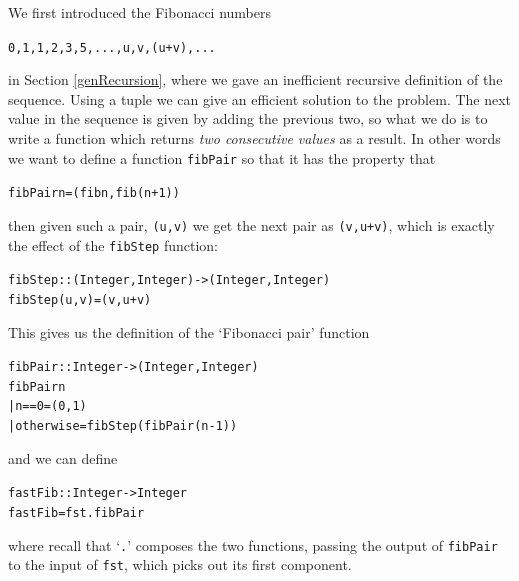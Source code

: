 \begin{example}
We first introduced the Fibonacci numbers 
\begin{alltt}
0, 1, 1, 2, 3, 5, ... , u, v, (u+v), ...
\end{alltt}
in Section \ref{genRecursion}, where we gave an inefficient recursive definition of
the sequence. Using a tuple we can give an efficient
solution to the problem. The next value in the sequence is given by
adding the previous two, so what we do is to write a function which
returns {\em two consecutive values\/} as a result. In other words we want to define
a function \texttt{fibPair} so that it has the property that
\begin{alltt}
fibPair n = (fib n , fib (n+1))
\end{alltt} 
then given such a pair, \texttt{(u,v)} we get the next pair as
\texttt{(v,u+v)}, which is exactly the effect of the \texttt{fibStep} function:
\begin{alltt}
fibStep :: (Integer,Integer) -> (Integer,Integer)
fibStep (u,v) = (v,u+v)
\end{alltt}
This gives us the definition of the `Fibonacci pair' function
\begin{alltt}
fibPair :: Integer -> (Integer,Integer)
fibPair n
  | n==0        = (0,1)
  | otherwise   = fibStep (fibPair (n-1))
\end{alltt}
and we can define
\begin{alltt}
fastFib :: Integer -> Integer
fastFib = fst . fibPair
\end{alltt}
where recall that `\texttt{.}' composes the two functions, passing the
output of \texttt{fibPair}
to the input of \texttt{fst}, which picks out its first component.
\end{example}


